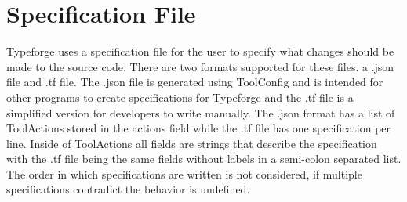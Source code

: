 \documentclass[natbib]{article}
\begin{document}
\section{Specification File}
Typeforge uses a specification file for the user to specify what changes should be 
made to the source code. There are two formats supported for these files. a .json 
file and .tf file. The .json file is generated using ToolConfig and is intended 
for other programs to create specifications for Typeforge and the .tf file is a 
simplified version for developers to write manually. The .json format has a list 
of ToolActions stored in the actions field while the .tf file has one specification 
per line. Inside of ToolActions all fields are strings that describe the specification 
with the .tf file being the same fields without labels in a semi-colon separated list. 
The order in which specifications are written is not considered, if multiple 
specifications contradict the behavior is undefined. 
\end{document}
